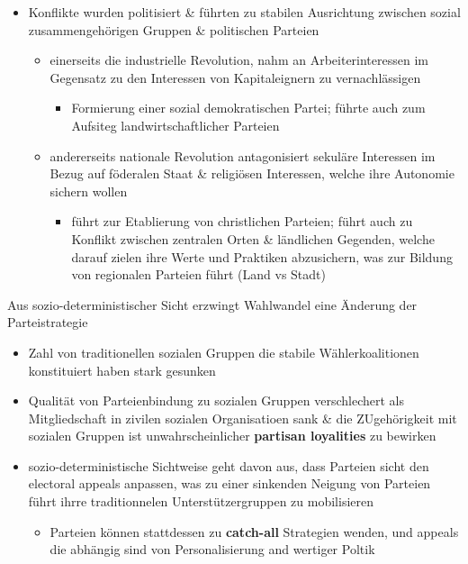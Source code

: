\documentclass[11pt]{article}
\begin{document}
\begin{itemize}
\item Konflikte wurden politisiert \& führten zu stabilen Ausrichtung zwischen sozial zusammengehörigen Gruppen \& politischen Parteien 
\begin{itemize}
\item einerseits die industrielle Revolution, nahm an Arbeiterinteressen im Gegensatz zu den Interessen von Kapitaleignern zu vernachlässigen 
\begin{itemize}
\item Formierung einer sozial demokratischen Partei; führte auch zum Aufsiteg landwirtschaftlicher Parteien
\end{itemize}
\item andererseits nationale Revolution antagonisiert sekuläre Interessen im Bezug auf föderalen Staat \& religiösen Interessen, welche ihre Autonomie sichern wollen 
\begin{itemize}
\item führt zur Etablierung von christlichen Parteien; führt auch zu Konflikt zwischen zentralen Orten \& ländlichen Gegenden, welche darauf zielen ihre Werte und Praktiken abzusichern, was zur Bildung von regionalen Parteien führt (Land vs Stadt)
\end{itemize}
\end{itemize}
\end{itemize}

Aus sozio-deterministischer Sicht erzwingt Wahlwandel eine Änderung der Parteistrategie 

\begin{itemize}
\item Zahl von traditionellen sozialen Gruppen die stabile Wählerkoalitionen konstituiert haben stark gesunken
\item Qualität von Parteienbindung zu sozialen Gruppen verschlechert als Mitgliedschaft in zivilen sozialen Organisatioen sank \& die ZUgehörigkeit mit sozialen Gruppen ist unwahrscheinlicher \textbf{partisan loyalities} zu bewirken
\item sozio-deterministische Sichtweise geht davon aus, dass Parteien sicht den electoral appeals anpassen, was zu einer sinkenden Neigung von Parteien führt ihrre traditionnelen Unterstützergruppen zu mobilisieren 
\begin{itemize}
\item Parteien können stattdessen zu \textbf{catch-all} Strategien wenden, und appeals die abhängig sind von Personalisierung and wertiger Poltik
\end{itemize}
\end{itemize}
\end{document}
